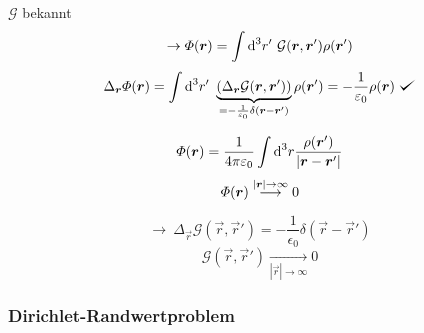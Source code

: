 \noindent
$\mathcal G$ bekannt 
$$\rightarrow \pofr = \int \dd^3 r'\ \mathcal G(\vec{r}, \vec{r}') \rho(\vec{r}')$$
$$\Delta_{\vec{r}} \pofr = \int \dd^3 r'\ \underbrace{(\Delta_{\vec{r}} \mathcal G(\vec{r}, \vec{r}'))}_{= -\frac{1}{\epsilon_0} \delta(\vec{r}-\vec{r}')} \rho (\vec{r}') = - \frac{1}{\epsilon_0} \rho (\vec{r})\ \checkmark$$
\begin{center}
	\begin{minipage}{.45
			\linewidth}
	\end{minipage}
\end{center}
\begin{equation*}
\varPhi(\bm{r}) = \frac{1}{4 \pi \varepsilon_0} \int \textrm{d}^3 r \frac{\rho(\bm{r}')}{|\bm{r} - \bm{r}'|}
\end{equation*}
\begin{equation*}
\pofr \buildrel |\vec{r}| \to \infty \over \longrightarrow 0
\end{equation*}

$$\rightarrow\ \Delta_{\vec{r}} \mathcal G(\vec{r}, \vec{r}') = - \frac{1}{\epsilon_0} \delta(\vec{r} - \vec{r}')$$
$$\mathcal G(\vec{r}, \vec{r}') \underset{|\vec{r}| \to \infty} \longrightarrow 0 $$

\subsubsection{Dirichlet-Randwertproblem}

